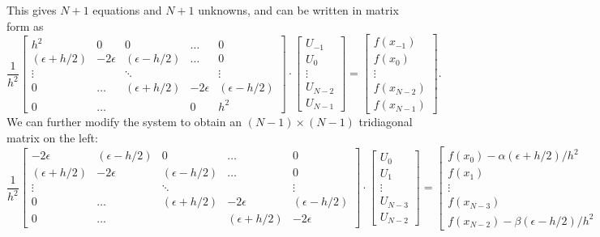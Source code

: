 This gives $N+1$ equations and $N+1$ unknowns, and can be written in matrix form as
\[ \frac{1}{h^2} \begin{bmatrix}h^2 & 0 &0&\hdots &0 \\ (\epsilon + h/2) &-2\epsilon & (\epsilon - h/2) &\hdots &0\\ \vdots &  & \ddots & &\vdots \\
0 & \hdots & (\epsilon + h/2) &-2\epsilon & (\epsilon - h/2) \\ 0 & \hdots & & 0 & h^2
\end{bmatrix} \cdot \begin{bmatrix}U_{-1}\\U_0\\ \vdots \\U_{N-2} \\U_{N-1}\end{bmatrix} = \begin{bmatrix}f(x_{-1})\\f(x_0)\\ \vdots \\ f(x_{N-2}) \\ f(x_{N-1}) \end{bmatrix}.
\]
We can further modify the system to obtain an $(N-1)\times (N-1)$ tridiagonal matrix on the left:
\[\frac{1}{h^2} \begin{bmatrix}-2\epsilon & (\epsilon - h/2) &0&\hdots &0 \\ (\epsilon + h/2) &-2\epsilon & (\epsilon - h/2) &\hdots &0\\ \vdots &  & \ddots & &\vdots \\
0 & \hdots & (\epsilon + h/2) &-2\epsilon & (\epsilon - h/2) \\ 0 & \hdots & & (\epsilon + h/2) &-2\epsilon
\end{bmatrix} \cdot \begin{bmatrix}U_{0}\\U_1\\ \vdots \\U_{N-3} \\U_{N-2}\end{bmatrix} = \begin{bmatrix}f(x_0) -\alpha(\epsilon + h/2)/h^2 \\f(x_1)\\ \vdots \\ f(x_{N-3})\\ f(x_{N-2})-\beta(\epsilon - h/2)/h^2 \end{bmatrix}.
\]

